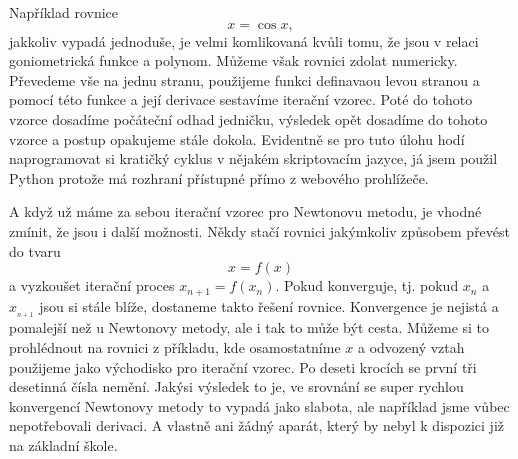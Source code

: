 \documentclass[12pt]{article}
\begin{document}
Například rovnice $$x=\cos x,$$ jakkoliv vypadá jednoduše, je velmi komlikovaná kvůli tomu, že jsou v relaci goniometrická funkce a polynom. Můžeme však rovnici zdolat numericky. Převedeme vše na jednu stranu, použijeme funkci definavaou levou stranou a pomocí této funkce a její derivace sestavíme iterační vzorec. Poté do tohoto vzorce dosadíme počáteční odhad jedničku, výsledek opět dosadíme do tohoto vzorce a postup opakujeme stále dokola. Evidentně se pro tuto úlohu hodí naprogramovat si kratičký cyklus v nějakém skriptovacím jazyce, já jsem použil Python protože má rozhraní přístupné přímo z webového prohlížeče.

A když už máme za sebou iterační vzorec pro Newtonovu metodu, je vhodné zmínit, že jsou i další možnosti. Někdy stačí rovnici jakýmkoliv způsobem převést do tvaru $$x=f(x)$$ a vyzkoušet iterační proces $x_{n+1}=f(x_n)$. Pokud konverguje, tj. pokud $x_n$ a $x__{n+1}$ jsou si stále blíže, dostaneme takto řešení rovnice. Konvergence je nejistá a pomalejší než u Newtonovy metody, ale i tak to může být cesta. Můžeme si to prohlédnout na rovnici z příkladu, kde osamostatníme $x$ a odvozený vztah použijeme jako východisko pro iterační vzorec. Po deseti krocích se první tři desetinná čísla nemění. Jakýsi výsledek to je, ve srovnání se super rychlou konvergencí Newtonovy metody to vypadá jako slabota, ale například jsme vůbec nepotřebovali derivaci. A vlastně ani žádný aparát, který by nebyl k dispozici již na základní škole.
\end{document}
